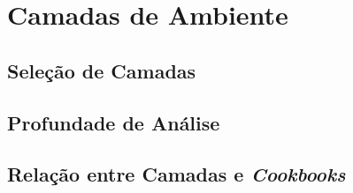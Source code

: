 \section{Camadas de Ambiente}

\subsection{Seleção de Camadas}

\subsection{Profundade de Análise}

\subsection{Relação entre Camadas e \textit{Cookbooks}}
